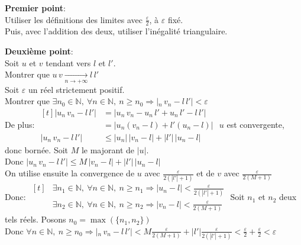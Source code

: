 \documentclass[12pt,twoside,a4paper]{article}
\begin{document}
		\begin{preuve}
			\begin{liste}
				\item\textbf{Premier point}:\\
					Utiliser les d\'efinitions des limites avec $\frac{\varepsilon}{2}$, \`a $\varepsilon$ fix\'e.\\
					Puis, avec l'addition des deux, utiliser l'in\'egalit\'e triangulaire.
				\item\textbf{Deuxi\`eme point}:\\
					Soit $u$ et $v$ tendant vers $l$ et $l'$.\\
					Montrer que $u\,v\mathop{\longrightarrow}\limits_{n\rightarrow+\infty}l\,l'$\\
					Soit $\varepsilon$ un r\'eel strictement positif.\\
					Montrer que $\exists n_0\in\mathbb{N},\ \forall n\in\mathbb{N},\ n\geqslant n_0\Rightarrow|_n\,v_n-l\,l'|<\varepsilon$\\
					De plus: $\begin{aligned}[t]
						|u_n\,v_n-l\,l'|&=|u_n\,v_n-u_n\,l'+u_n\,l'-l\,l'|\\
						                &=|u_n(v_n-l)+l'(u_n-l)|\\
						|u_n\,v_n-l\,l'|&\leqslant|u_n|\,|v_n-l|+|l'|\,|u_n-l|
					\end{aligned}$
					$u$ est convergente, donc born\'ee. Soit $M$ le majorant de $|u|$.\\
					Donc $|u_n\,v_n-l\,l'|\leqslant M\,|v_n-l|+|l'|\,|u_n-l|$\\
					On utilise ensuite la convergence de $u$ avec $\frac{\varepsilon}{2(|l'|+1)}$ et de $v$ avec $\frac{\varepsilon}{2(M+1)}$\\
					Donc: 
					$\begin{aligned}[t]
						&\exists n_1\in\mathbb{N},\ \forall n\in\mathbb{N},\ n\geqslant n_1\Rightarrow|u_n-l|<\frac{\varepsilon}{2(|l'|+1)}\\
						&\exists n_2\in\mathbb{N},\ \forall n\in\mathbb{N},\ n\geqslant n_2\Rightarrow|v_n-l|<\frac{\varepsilon}{2(M+1)}
					\end{aligned}$
					Soit $n_1$ et $n_2$ deux tels r\'eels. Posons $n_0=\max(\{n_1,n_2\})$\\
					Donc $\forall n\in\mathbb{N},\ n\geqslant n_0\Rightarrow|_n\,v_n-l\,l'|<M\frac{\varepsilon}{2(M+1)}+|l'|\frac{\varepsilon}{2(|l'|+1)}<\frac{\varepsilon}{2}+\frac{\varepsilon}{2}<\varepsilon$\\\\

\end{liste}
\end{preuve}
\end{document}
